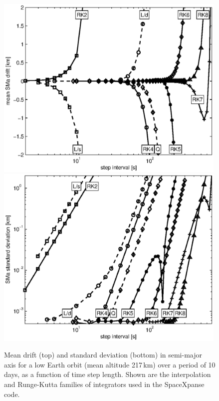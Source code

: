 \documentclass[a4paper]{article}
\begin{document}
\begin{figure}\centering
\includegraphics[width=0.99\textwidth]{sma_dev}\\
\includegraphics[width=0.99\textwidth]{sma_std}
\caption{Mean drift (top) and standard deviation (bottom) in semi-major axis for a low Earth orbit (mean altitude 217\,km) over a period of 10 days, as a function of time step length. Shown are the interpolation and Runge-Kutta families of integrators used in the SpaceXpanse code.}
\label{fig:1day_err}
\end{figure}
\end{document}
